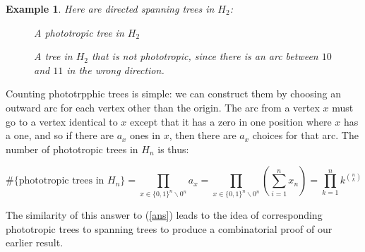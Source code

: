 \documentclass[11pt]{article}
\newtheorem{example}[theorem]{Example}
\begin{document}
\begin{example}
	Here are directed spanning trees in $H_2$:

	\begin{figure}[ht]
    \begin{center}
    \end{center}
    \caption{A phototropic tree in $H_2$}
	\end{figure}


\pagebreak


	\begin{figure}[ht]
  	\begin{center}   
    
    \end{center}
    \caption{A tree in $H_2$ that is not phototropic, since there is an arc between $10$ and $11$ in the wrong direction.}
	\end{figure}
	
\end{example}

Counting phototrpphic trees is simple: we can construct them by choosing an outward arc for each vertex other than the origin. The arc from a vertex $x$ must go to a vertex identical to $x$ except that it has a zero in one position where $x$ has a one, and so if there are $a_x$ ones in $x$, then there are $a_x$ choices for that arc. The number of phototropic trees in $H_n$ is thus:

$$ \#\{\text{phototropic trees in }H_n\} = \prod_{x \in \{0,1\}^n \backslash 0^n} a_x = \prod_{x \in \{0,1\}^n \backslash 0^n} \left(\sum_{i=1}^n x_n \right) = \prod_{k=1}^n k^{\binom{n}{k}} $$

The similarity of this answer to (\ref{ans}) leads to the idea of corresponding phototropic trees to spanning trees to produce a combinatorial proof of our earlier result.
\end{document}
